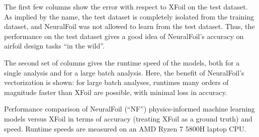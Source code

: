 \documentclass[conf]{new-aiaa}
\begin{document}
    The first few columns show the error with respect to XFoil on the test dataset. As implied by the name, the test dataset is completely isolated from the training dataset, and NeuralFoil was not allowed to learn from the test dataset. Thus, the performance on the test dataset gives a good idea of NeuralFoil's accuracy on airfoil design tasks ``in the wild''.

    The second set of columns gives the runtime speed of the models, both for a single analysis and for a large batch analysis. Here, the benefit of NeuralFoil's vectorization is shown: for large batch analyses, runtimes many orders of magnitude faster than XFoil are possible, with minimal loss in accuracy.

    \begin{table}[h]
        \centering
        \caption{Performance comparison of NeuralFoil (``NF'') physics-informed machine learning models versus XFoil in terms of accuracy (treating XFoil as a ground truth) and speed. Runtime speeds are measured on an AMD Ryzen 7 5800H laptop CPU.}
        \label{tab:neuralfoil_performance}

        \begin{adjustbox}{width=\textwidth}


\end{adjustbox}
\end{table}
\end{document}
